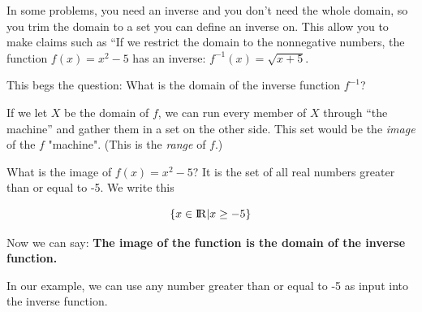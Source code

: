 In some problems, you need an inverse and you don't  need the
whole domain, so you trim the domain to a set you can define an
inverse on. This allow you to make claims such as ``If we restrict the domain to
the nonnegative numbers, the function $f(x) = x^2 - 5$ has an inverse:
$f^{-1}(x) =\sqrt{x + 5}$.

This begs the question: What is the domain of the inverse function $f^{-1}$?

If we let $X$ be the domain of $f$, we can run every member of $X$
through ``the machine'' and gather them in a set on the other
side. This set would be the \textit{image} of the $f$ "machine". (This is the \textit{range} of $f$.)

What is the image of $f(x) = x^2 - 5$? It is the set of all real
numbers greater than or equal to -5. We write this

\begin{equation*}
  \{ x \in {\rm I\!R} | x \geq -5 \}
  \end{equation*}

Now we can say: \textbf{The image of the function is the domain
  of the inverse function.}

In our example, we can use any number greater
than or equal to -5 as input into the inverse function.



